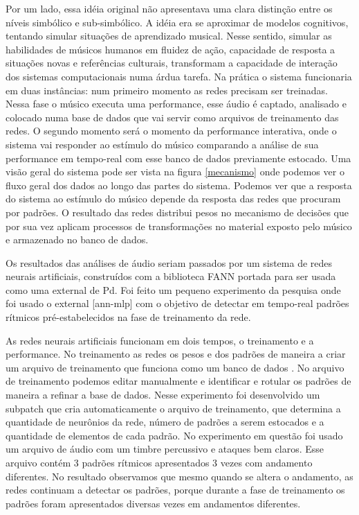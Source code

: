 \documentclass{ppgmus}
\begin{document}
Por um lado, essa idéia original não apresentava uma clara distinção entre os níveis simbólico e sub-simbólico.
A idéia era se aproximar de modelos cognitivos, tentando simular situações de aprendizado musical.
Nesse sentido, simular as habilidades de músicos humanos em fluidez de ação, capacidade de 
resposta a situações novas e referências culturais, transformam a capacidade de interação dos sistemas computacionais 
numa árdua tarefa. Na prática o sistema funcionaria em duas instâncias: num primeiro momento as redes precisam ser 
treinadas. Nessa fase o músico executa uma performance, esse áudio é captado, analisado e colocado numa base de dados 
que vai servir como arquivos de treinamento das redes. O segundo momento será o momento da performance interativa, 
onde o sistema vai responder ao estímulo do músico comparando a análise de sua performance em tempo-real com esse 
banco de dados previamente estocado. Uma visão geral do sistema pode ser vista na figura \ref{mecanismo} onde podemos ver o fluxo 
geral dos dados ao longo das partes do sistema. Podemos ver que a resposta do sistema ao estímulo do músico depende 
da resposta das redes que procuram por padrões. O resultado das redes distribui pesos no mecanismo de decisões que por 
sua vez aplicam processos de transformações no material exposto pelo músico e armazenado no banco de dados.
   

Os resultados das análises de áudio seriam passados por um sistema de redes neurais artificiais, 
construídos com a biblioteca FANN \cite{fann}  portada para ser usada como uma external de Pd.  
Foi feito um pequeno experimento da pesquisa onde foi usado o external [ann-mlp] com o objetivo de detectar  em tempo-real padrões 
rítmicos pré-estabelecidos na fase de treinamento da rede.
    
As redes neurais artificiais funcionam em dois tempos, o treinamento e a performance. No treinamento as redes os pesos e 
dos padrões de maneira a criar um arquivo de treinamento que funciona como um banco de dados . No arquivo de treinamento 
podemos editar manualmente e identificar e rotular os padrões de maneira a refinar a base de dados. Nesse experimento foi 
desenvolvido um subpatch que cria automaticamente o arquivo de treinamento, que determina a quantidade de neurônios da 
rede, número de padrões a serem estocados e a quantidade de elementos de cada padrão.
   No experimento em questão foi usado um arquivo de áudio com um timbre percussivo e ataques bem claros. Esse arquivo 
contém 3 padrões rítmicos apresentados 3 vezes com  andamento diferentes. No resultado observamos que mesmo quando se 
altera o andamento, as redes continuam a detectar os padrões, porque durante a fase de treinamento os padrões foram 
apresentados diversas vezes em andamentos diferentes.
\end{document}
